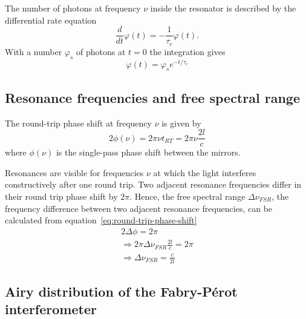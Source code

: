 The number of photons at frequency $\nu$ inside the resonator is described by the differential rate equation
\begin{equation}
\frac{d}{dt} \varphi(t) = - \frac{1}{\tau_c}\varphi(t).
\end{equation}
With a number $\varphi_s$ of photons at $t=0$ the integration gives
\begin{equation}
\varphi(t)=\varphi_s e^{-t/\tau_c}
\end{equation}

\subsection{Resonance frequencies and free spectral range}
The round-trip phase shift at frequency $\nu$ is given by 
\begin{equation}
\label{eq:round-trip-phase-shift}
2 \phi(\nu) = 2 \pi \nu t_{RT} = 2 \pi \nu \frac{2l}{c}
\end{equation}
where $\phi(\nu)$ is the single-pass phase shift between the mirrors.

Resonances are visible for frequencies $\nu$ at which the light interferes constructively after one round trip.
Two adjacent resonance frequencies differ in their round trip phase shift by $2 \pi$.
Hence, the free spectral range $\Delta \nu_{FSR}$, the frequency difference between two adjacent resonance frequencies, can be calculated from equation~\eqref{eq:round-trip-phase-shift}
\begin{align}
2\Delta\phi = 2\pi \\
\Rightarrow 2\pi\Delta\nu_{FSR}\frac{2l}{c} = 2\pi\\
\Rightarrow \Delta\nu_{FSR} = \frac{c}{2l}
\end{align}

\subsection{Airy distribution of the Fabry-Pérot interferometer}

